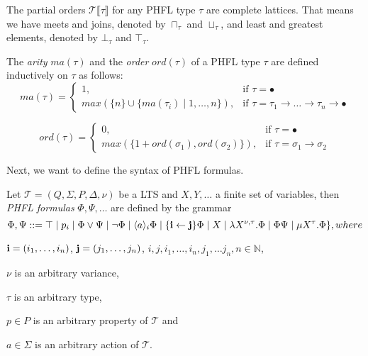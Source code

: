 The partial orders $\mathcal{T}\llbracket\tau\rrbracket$ for any PHFL type $\tau$ are complete lattices. That means we
have meets and joins, denoted by $\sqcap_\tau$ and $\sqcup_\tau$, and least and greatest elements, denoted by
$\bot_\tau$ and $\top_\tau$.

\begin{definition}
    The \emph{arity} $ma(\tau)$ and the \emph{order} $ord(\tau)$ of a PHFL type $\tau$ are defined inductively on
    $\tau$ as
follows:
\[ma(\tau)=
\begin{cases}
    1, & \text{if }\tau = \bullet\\
    max(\{n\} \cup \{ma(\tau_i)\mid1,\dots,n\}), &
    \text{if }\tau = \tau_1\rightarrow\dots\rightarrow\tau_n\rightarrow\bullet
\end{cases}\]

\[ord(\tau)=
\begin{cases}
    0, & \text{if }\tau = \bullet\\
    max(\{1 + ord(\sigma_1), ord(\sigma_2)\}), & \text{if }\tau = \sigma_1 \rightarrow \sigma_2
\end{cases}\]
\end{definition}

Next, we want to define the syntax of PHFL formulas.

\begin{definition}
    Let $\mathcal{T} = (Q, \Sigma, P, \Delta, \nu)$ be a LTS and $X, Y, \dots$ a finite set of variables, then
    \emph{PHFL formulas} $\Phi, \Psi,\dots$ are defined by the grammar
    \[\Phi,\Psi::=\top \mid p_i \mid \Phi \vee \Psi \mid \neg \Phi \mid \langle a \rangle_i \Phi \mid \{\emph{i}
    \leftarrow \emph{j}\} \Phi \mid X \mid \lambda X^{\nu,\tau}.\Phi \mid \Phi \Psi \mid \mu X^\tau.\Phi\}, where\]
    \begin{compactitem}
        \item $\emph{i} = (i_1,\dots, i_n)$, $\emph{j} = (j_1,\dots,j_n)$, $i, j, i_1,\dots,i_n, j_1, \dots j_n, n\in
        \mathbb{N}$,
        \item $\nu$ is an arbitrary variance,
        \item $\tau$ is an arbitrary type,
        \item $p \in P$ is an arbitrary property of $\mathcal{T}$ and
        \item $a \in \Sigma$ is an arbitrary action of $\mathcal{T}$.
    \end{compactitem}
\end{definition}

